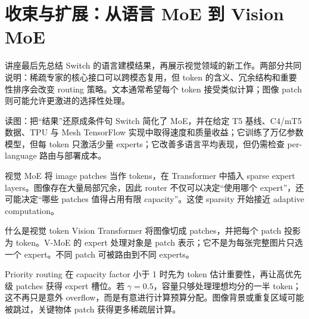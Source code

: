 \section{收束与扩展：从语言 MoE 到 Vision MoE}

讲座最后先总结 Switch 的语言建模结果，再展示视觉领域的新工作。两部分共同说明：稀疏专家的核心接口可以跨模态复用，但 token 的含义、冗余结构和重要性排序会改变 routing 策略。文本通常希望每个 token 接受类似计算；图像 patch 则可能允许更激进的选择性处理。


\begin{knowledgebox}{读图：把“结果”还原成条件句}
Switch 简化了 MoE，并在给定 T5 基线、C4/mT5 数据、TPU 与 Mesh TensorFlow 实现中取得速度和质量收益；它训练了万亿参数模型，但每 token 只激活少量 experts；它改善多语言平均表现，但仍需检查 per-language 路由与部署成本。
\end{knowledgebox}

视觉 MoE 将 image patches 当作 tokens，在 Transformer 中插入 sparse expert layers。图像存在大量局部冗余，因此 router 不仅可以决定“使用哪个 expert”，还可能决定“哪些 patches 值得占用有限 capacity”。这使 sparsity 开始接近 adaptive computation。


\begin{knowledgebox}{什么是视觉 token}
Vision Transformer 将图像切成 patches，并把每个 patch 投影为 token。V-MoE 的 expert 处理对象是 patch 表示；它不是为每张完整图片只选一个 expert。不同 patch 可被路由到不同 experts。
\end{knowledgebox}

Priority routing 在 capacity factor 小于 1 时先为 token 估计重要性，再让高优先级 patches 获得 expert 槽位。若 $\gamma=0.5$，容量只够处理理想均分的一半 token；这不再只是意外 overflow，而是有意进行计算预算分配。图像背景或重复区域可能被跳过，关键物体 patch 获得更多稀疏层计算。



